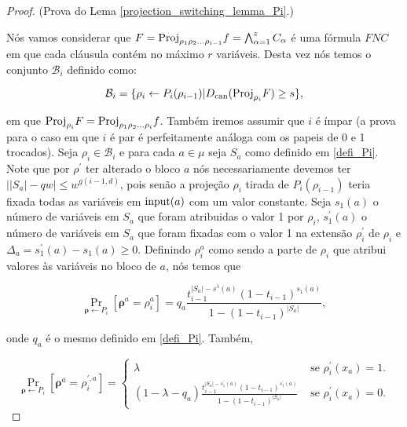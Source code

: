 \begin{proof} (Prova do Lema \ref{projection_switching_lemma_Pi}.)

	Nós vamos considerar que $F = \text{Proj}_{\rho_{1}\rho_{2}\dots\rho_{i - 1}}f = \bigwedge_{\alpha = 1}^{z}C_{\alpha}$ é uma fórmula $FNC$ em que cada cláusula contém no máximo $r$ variáveis. Desta vez nós temos o conjunto $\mathcal{B}_{i}$ definido como:
	
	\begin{equation*}
		\mathcal{B}_{i} = \{\rho_{i} \leftarrow P_{i}(\rho_{i - 1}) \lvert D_{\text{can}}(\text{Proj}_{\rho_{i}}F) \geq s\},
	\end{equation*}
	
	em que $\text{Proj}_{\rho_{i}}F = \text{Proj}_{\rho_{1}\rho_{2}\dots\rho_{i}}f$. Também iremos assumir que $i$ é ímpar (a prova para o caso em que $i$ é par é perfeitamente análoga com os papeis de 0 e 1 trocados). Seja $\rho_{i} \in \mathcal{B}_{i}$ e para cada $a \in \mu$ seja $S_{a}$ como definido em \ref{defi_Pi}. Note que por $\rho^{\prime}$ ter alterado o bloco $a$ nós necessariamente devemos ter $\big\lvert \lvert S_{a} \rvert - qw \big\rvert \leq w^{g(i  - 1, d)}$, pois senão a projeção $\rho_{i}$ tirada de $P_{i}(\rho_{i - 1})$ teria fixada todas as variáveis em $\text{input}(a)$ com um valor constante. Seja $s_{1}(a)$ o número de variáveis em $S_{a}$ que foram atribuidas o valor 1 por $\rho_{i}$, $s_{1}^{\prime}(a)$ o número de variáveis em $S_{a}$ que foram fixadas com o valor 1 na extensão $\rho_{i}^{\prime}$ de $\rho_{i}$ e $\Delta_{a} = s_{1}^{\prime}(a) - s_{1}(a) \geq 0$. Definindo $\rho_{i}^{a}$ como sendo a parte de $\rho_{i}$ que atribui valores às variáveis no bloco de $a$, nós temos que
	
	\begin{equation*}
		\Pr_{\boldsymbol{\rho} \leftarrow P_{i}}[\boldsymbol{\rho}^{a} = \rho_{i}^{a}] = q_{a}\frac{t_{i - 1}^{\lvert S_{a} \rvert - s^{1}(a)}(1 - t_{i - 1})^{s_{1}(a)}}{1 - (1 - t_{i - 1})^{\lvert S_{a} \rvert}},
	\end{equation*}

	onde $q_{a}$ é o mesmo definido em \ref{defi_Pi}. Também,
	
	\begin{equation*}
		\Pr_{\boldsymbol{\rho} \leftarrow P_{i}}[\boldsymbol{\rho}^{a} = \rho_{i}^{\prime, a}] = \begin{cases}
															         	\lambda & \text{ se } \rho_{i}^{\prime}(x_{a}) = 1. \\
															         	(1 - \lambda - q_{a})\frac{t_{i - 1}^{\lvert S_{a} \rvert - s_{1}^{\prime}(a)}(1 - t_{i - 1})^{s_{1}^{\prime}(a)}}{1 - (1 - t_{i - 1})^{\lvert S_{a} \rvert}} & \text{ se } \rho_{i}^{\prime}(x_{a}) = 0.
															         \end{cases}
	\end{equation*}


\end{proof}
